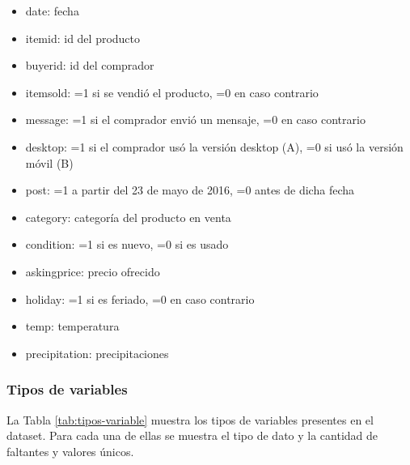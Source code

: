 \documentclass[
  12pt]{article}
\providecommand{\tightlist}{%
  \setlength{\itemsep}{0pt}\setlength{\parskip}{0pt}}
\begin{document}
\begin{itemize}
\tightlist
\item
  date: fecha
\item
  itemid: id del producto
\item
  buyerid: id del comprador
\item
  itemsold: =1 si se vendió el producto, =0 en caso contrario
\item
  message: =1 si el comprador envió un mensaje, =0 en caso contrario
\item
  desktop: =1 si el comprador usó la versión desktop (A), =0 si usó la versión móvil (B)
\item
  post: =1 a partir del 23 de mayo de 2016, =0 antes de dicha fecha
\item
  category: categoría del producto en venta
\item
  condition: =1 si es nuevo, =0 si es usado
\item
  askingprice: precio ofrecido
\item
  holiday: =1 si es feriado, =0 en caso contrario
\item
  temp: temperatura
\item
  precipitation: precipitaciones
\end{itemize}

\hypertarget{tipos-de-variables}{%
\subsubsection{Tipos de variables}\label{tipos-de-variables}}

La Tabla \ref{tab:tipos-variable} muestra los tipos de variables presentes en el dataset. Para cada una de ellas se muestra el tipo de dato y la cantidad de faltantes y valores únicos.
\end{document}
